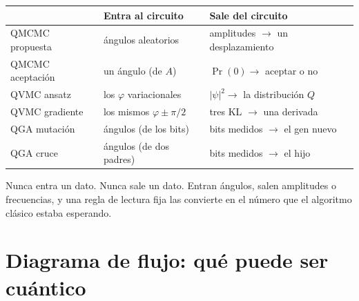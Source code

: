 \documentclass[11pt,a4paper]{article}
\begin{document}
\begin{center}
\small
\begin{tabular}{@{}lll@{}}
\toprule
& \textbf{Entra al circuito} & \textbf{Sale del circuito} \\
\midrule
QMCMC propuesta   & ángulos aleatorios             & amplitudes $\to$ un desplazamiento \\
QMCMC aceptación  & un ángulo (de $A$)             & $\Pr(0) \to$ aceptar o no \\
QVMC ansatz       & los $\varphi$ variacionales    & $|\psi|^2 \to$ la distribución $Q$ \\
QVMC gradiente    & los mismos $\varphi \pm \pi/2$ & tres KL $\to$ una derivada \\
QGA mutación      & ángulos (de los bits)          & bits medidos $\to$ el gen nuevo \\
QGA cruce         & ángulos (de dos padres)        & bits medidos $\to$ el hijo \\
\bottomrule
\end{tabular}
\end{center}

\noindent
Nunca entra un dato. Nunca sale un dato. Entran ángulos, salen amplitudes o
frecuencias, y una regla de lectura fija las convierte en el número que el
algoritmo clásico estaba esperando.

\clearpage
\section{Diagrama de flujo: qué puede ser cuántico}
\end{document}
